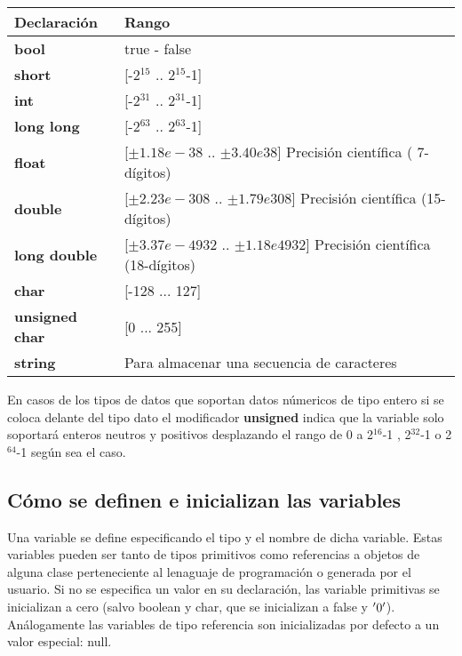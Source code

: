 \begin{tabular}{|p{2.5cm}|p{12.3cm}|}
	\hline 
	\textbf{Declaración}  & \textbf{Rango}   \\ 	
	\hline 
	\textbf{bool}  & true - false   \\ 
	\hline	
	\textbf{short}     & [-2$^{15}$ .. 2$^{15}$-1]   \\ 
	\hline	
	\textbf{int}    & [-2$^{31}$ .. 2$^{31}$-1]   \\ 
	\hline	
	\textbf{long long}  & [-2$^{63}$ .. 2$^{63}$-1]    \\ 
	\hline	
	\textbf{float}   & [$\pm1.18e-38 $ .. $\pm3.40e38$] Precisión científica ( 7-dígitos)  \\ 
	\hline	
	\textbf{double}     & [$\pm2.23e-308$ .. $\pm1.79e308$] Precisión científica (15-dígitos)  \\ 
	\hline	
	\textbf{long double}     & [$\pm3.37e-4932$ .. $\pm1.18e4932$]  Precisión científica (18-dígitos) \\ 
	\hline	
	\textbf{char} & [-128 ... 127]  \\ 
	\hline	
	\textbf{unsigned char} & [0 ... 255]  \\ 
	\hline
	\textbf{string} & Para almacenar una secuencia de caracteres  \\ 
	\hline
\end{tabular}
\vspace*{1em}

En casos de los tipos de datos que soportan datos númericos de tipo entero si se coloca delante del tipo dato el modificador \textbf{unsigned} indica que la variable solo soportará enteros neutros y positivos desplazando el rango de 0 a 2$^{16}$-1 , 2$^{32}$-1 o 2$^{64}$-1  según sea el caso.

\subsection{Cómo se definen e inicializan las variables}

Una variable se define especificando el tipo y el nombre de dicha variable. Estas variables pueden
ser tanto de tipos primitivos como referencias a objetos de alguna clase perteneciente al lenaguaje de programación o generada por el usuario. Si no se especifica un valor en su declaración, las variable
primitivas se inicializan a cero (salvo boolean y char, que se inicializan a false y $'\\0'$).
Análogamente las variables de tipo referencia son inicializadas por defecto a un valor especial:
null.

